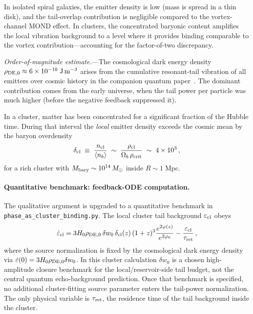 \documentclass[11pt]{article}
\begin{document}
In isolated spiral galaxies, the emitter density is low (mass
is spread in a thin disk), and the tail-overlap contribution
is negligible compared to the vortex-channel MOND effect.
In clusters, the concentrated baryonic content amplifies the
local vibration background to a level where it provides
binding comparable to the vortex contribution---accounting for
the factor-of-two discrepancy.

\textit{Order-of-magnitude estimate.}---The cosmological dark
energy density $\rho_{\rm DE,0}\approx 6\times10^{-10}\;
\mathrm{J\,m^{-3}}$ arises from the cumulative resonant-tail
vibration of all emitters over cosmic history in the companion
quantum paper~\cite{Lotishvili2026Q}.  The
dominant contribution comes from the early universe, when the
tail power per particle was much higher (before the negative
feedback suppressed it).

In a cluster, matter has been concentrated for a significant
fraction of the Hubble time.  During that interval the
\emph{local} emitter density exceeds the cosmic mean by the
baryon overdensity
\begin{equation}\label{eq:delta_cl}
  \delta_{\rm cl}
  \;\equiv\; \frac{n_{\rm cl}}{\langle n_{b}\rangle}
  \;\sim\; \frac{\rho_{\rm cl}}{\Omega_b\,\rho_{\rm crit}}
  \;\sim\; 4\times10^{3}\,,
\end{equation}
for a rich cluster with $M_{\rm bary}\sim10^{14}\,M_\odot$
inside $R\sim1\;\mathrm{Mpc}$.

\paragraph{Quantitative benchmark: feedback-ODE computation.}
The qualitative argument is upgraded to a quantitative benchmark
in \texttt{phase\_as\_cluster\_binding.py}.  The local cluster
tail background $\varepsilon_{\rm cl}$ obeys
\begin{equation}\label{eq:cluster_retention_ode}
  \dot{\varepsilon}_{\rm cl}
  =
  3H_0\rho_{\rm DE,0}\,\delta w_0\,
  \delta_{\rm cl}(z)\,(1+z)^3
  \frac{e^{2\varphi(z)}}{e^{2\varphi_0}}
  -
  \frac{\varepsilon_{\rm cl}}{\tau_{\rm ret}}\,,
\end{equation}
where the source normalization is fixed by the cosmological
dark energy density via
$\dot{\varepsilon}(0)=3H_0\rho_{\rm DE,0}\delta w_0$.  In this
cluster calculation $\delta w_0$ is a chosen high-amplitude
closure benchmark for the local/reservoir-side tail budget, not
the central quantum echo-background prediction.  Once that
benchmark is specified, no additional cluster-fitting source
parameter enters the tail-power normalization.  The only physical variable
is $\tau_{\rm ret}$, the residence time of the tail background
inside the cluster.
\end{document}

